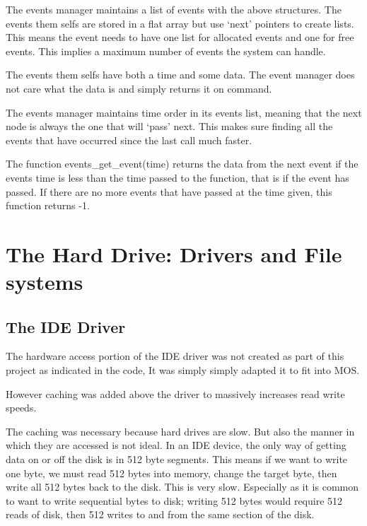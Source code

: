 \documentclass[a4paper]{report}
\begin{document}
The events manager maintains a list of events with the above structures. The events them selfs are stored in a flat array but use `next' pointers to create lists. This means the event needs to have one list for allocated events and one for free events. This implies a maximum number of events the system can handle.

The events them selfs have both a time and some data. The event manager does not care what the data is and simply returns it on command.

The events manager maintains time order in its events list, meaning that the next node is always the one that will `pass' next. This makes sure finding all the events that have occurred since the last call much faster.

The function events\_get\_event(time) returns the data from the next event if the events time is less than the time passed to the function, that is if the event has passed. If there are no more events that have passed at the time given, this function returns -1.










\clearpage
\section{The Hard Drive: Drivers and File systems}

\subsection{The IDE Driver}

The hardware access portion of the IDE driver was not created as part of this project as indicated in the code, It was simply simply adapted it to fit into MOS.

However caching was added above the driver to massively increases read write speeds.

The caching was necessary because hard drives are slow. But also the manner in which they are accessed is not ideal. In an IDE device, the only way of getting data on or off the disk is in 512 byte segments. This means if we want to write one byte, we must read 512 bytes into memory, change the target byte, then write all 512 bytes back to the disk. This is very slow. Especially as it is common to want to write sequential bytes to disk; writing 512 bytes would require 512 reads of disk, then 512 writes to and from the same section of the disk.
\end{document}
